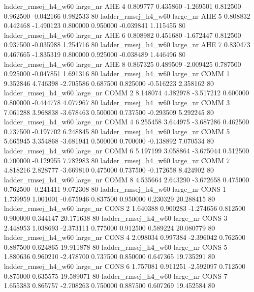 ladder_rmsej_h4_w60   large_nr      AHE                 4  0.809777  0.435860  -1.269501 0.812500 0.962500 -0.042166    0.982533 80
ladder_rmsej_h4_w60   large_nr      AHE                 5  0.808832  0.442468  -1.490123 0.800000 0.950000 -0.039841    1.115455 80
ladder_rmsej_h4_w60   large_nr      AHE                 6  0.808982  0.451680  -1.672447 0.812500 0.937500 -0.035988    1.254716 80
ladder_rmsej_h4_w60   large_nr      AHE                 7  0.830473  0.467665  -1.835319 0.800000 0.925000 -0.038489    1.446496 80
ladder_rmsej_h4_w60   large_nr      AHE                 8  0.867325  0.489509  -2.009425 0.787500 0.925000 -0.047851    1.691316 80
ladder_rmsej_h4_w60   large_nr     COMM                 1  9.352846  4.746398  -2.705586 0.687500 0.825000 -0.516223    2.358162 80
ladder_rmsej_h4_w60   large_nr     COMM                 2  8.148074  4.382978  -3.517212 0.600000 0.800000 -0.444778    4.077967 80
ladder_rmsej_h4_w60   large_nr     COMM                 3  7.061288  3.968838  -3.678463 0.500000 0.737500 -0.293509    5.292245 80
ladder_rmsej_h4_w60   large_nr     COMM                 4  6.255458  3.644975  -3.687286 0.462500 0.737500 -0.197702    6.248845 80
ladder_rmsej_h4_w60   large_nr     COMM                 5  5.665945  3.354868  -3.681941 0.500000 0.700000 -0.138892    7.070534 80
ladder_rmsej_h4_w60   large_nr     COMM                 6  5.197199  3.058864  -3.675044 0.512500 0.700000 -0.129955    7.782983 80
ladder_rmsej_h4_w60   large_nr     COMM                 7  4.818216  2.828777  -3.669810 0.475000 0.737500 -0.172658    8.424902 80
ladder_rmsej_h4_w60   large_nr     COMM                 8  4.535664  2.643290  -3.672658 0.475000 0.762500 -0.241411    9.072308 80
ladder_rmsej_h4_w60   large_nr     CONS                 1  1.739959  1.001001  -0.675946 0.837500 0.950000  0.230329   20.288415 80
ladder_rmsej_h4_w60   large_nr     CONS                 2  1.640388  0.900283  -1.274656 0.812500 0.900000  0.344147   20.171638 80
ladder_rmsej_h4_w60   large_nr     CONS                 3  2.448953  1.038693  -2.373111 0.775000 0.912500  0.589224   20.080779 80
ladder_rmsej_h4_w60   large_nr     CONS                 4  2.098034  0.997384  -2.396042 0.762500 0.887500  0.624865   19.911878 80
ladder_rmsej_h4_w60   large_nr     CONS                 5  1.880636  0.960210  -2.478700 0.737500 0.850000  0.647365   19.735291 80
ladder_rmsej_h4_w60   large_nr     CONS                 6  1.757081  0.911251  -2.592097 0.712500 0.875000  0.635575   19.589071 80
ladder_rmsej_h4_w60   large_nr     CONS                 7  1.655383  0.865757  -2.708263 0.750000 0.887500  0.607269   19.452584 80
